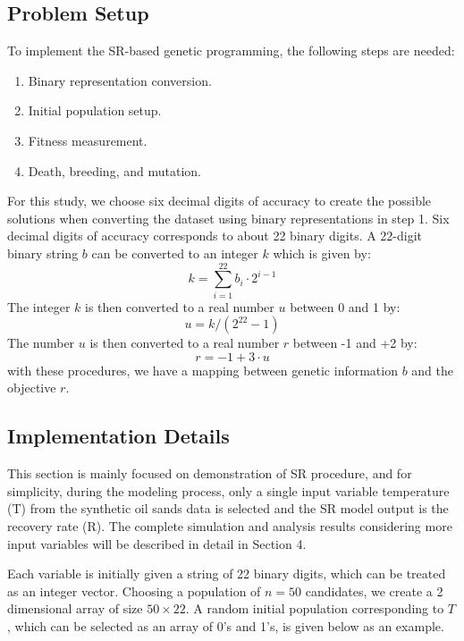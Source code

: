 \documentclass[final,5p,times,twocolumn]{elsarticle}
\begin{document}
\subsection{Problem Setup}

To implement the SR-based genetic programming, the following steps are needed:
\begin{enumerate}
	\item  Binary representation conversion. 
	\item  Initial population setup.
	\item  Fitness measurement.
	\item  Death, breeding, and mutation.
\end{enumerate}

For this study, we choose six decimal digits of accuracy to create the possible solutions when converting the dataset using binary representations in step 1. Six decimal digits of accuracy corresponds to about 22 binary digits. A 22-digit binary string $b$ can be converted
to an integer $k$ which is given by:
\begin{equation}
k = \sum_{i=1}^{22} b_i \cdot 2^{i-1}
\end{equation}
The integer $k$ is then converted to a real number $u$ between 0 and 1 by:
\begin{equation}	
u = k / ( 2^{22}-1)
\end{equation}
The number $u$ is then converted to a real number $r$ between -1 and +2 by:
\begin{equation}	
r = -1 + 3 \cdot u
\end{equation}
with these procedures, we have a mapping between genetic information $b$ and
the objective $r$.

\subsection{Implementation Details}

This section is mainly focused on demonstration of SR procedure, and for simplicity, during the modeling process, only a single input variable temperature (T) from the synthetic oil sands data is selected and the SR model output is the recovery rate (R). The complete simulation and analysis results considering more input variables will be described in detail in Section 4. 


Each variable is initially given a string of 22 binary digits, which can be treated as an integer vector.
\vskip 0.1in
Choosing a population of $n = 50$ candidates, we create a 2 dimensional array of size $50 \times 22$.
\vskip 0.1in
A random initial population corresponding to $T$, which can be selected as an array of 0's and 1's, is given below as an example.
\end{document}
